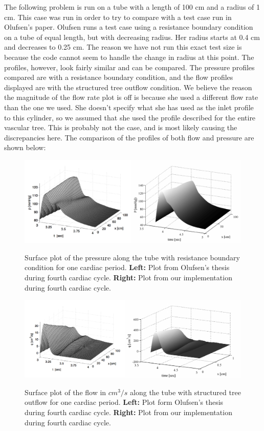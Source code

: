 \documentclass[12pt]{article}
\begin{document}
 The following problem is run on a tube with a length of 100 cm and a radius of 1 cm. This case was run in order to try to compare with a test case run in Olufsen's paper. Olufsen runs a test case using a resistance boundary condition on a tube of equal length, but with decreasing radius. Her radius starts at 0.4 cm and decreases to 0.25 cm. The reason we have not run this exact test size is because the code cannot seem to handle the change in radius at this point. The profiles, however, look fairly similar and can be compared. The pressure profiles compared are with a resistance boundary condition, and the flow profiles displayed are with the structured tree outflow condition. We believe the reason the magnitude of the flow rate plot is off is because she used a different flow rate than the one we used. She doesn't specify what she has used as the inlet profile to this cylinder, so we assumed that she used the profile described for the entire vascular tree. This is probably not the case, and is most likely causing the discrepancies here. The comparison of the profiles of both flow and pressure are shown below:

\begin{figure}[ht]
	\centering
	\includegraphics[width=6in]{pplot}
	\label{ours}
	\caption{Surface plot of the pressure along the tube with resistance boundary condition for one cardiac period. \textbf{Left:} Plot from Olufsen's thesis during fourth cardiac cycle. \textbf{Right:} Plot from our implementation during fourth cardiac cycle.}
\end{figure}

\begin{figure}[ht]
	\centering
	\includegraphics[width=6in]{qplot}
	\label{ours}
	\caption{Surface plot of the flow in $cm^3/s$ along the tube with structured tree outflow for one cardiac period. \textbf{Left:} Plot form Olufsen's thesis during fourth cardiac cycle. \textbf{Right: } Plot from our implementation during fourth cardiac cycle.}
\end{figure}
\end{document}
